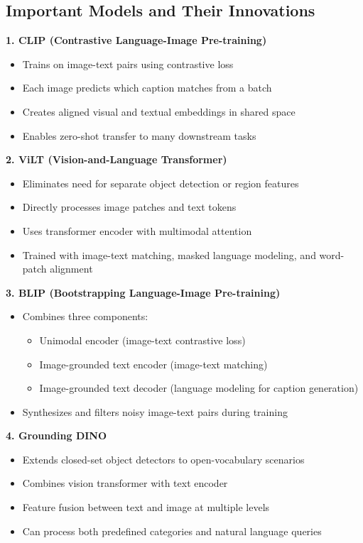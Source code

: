 \subsection*{Important Models and Their Innovations}

\textbf{1. CLIP (Contrastive Language-Image Pre-training)}
\begin{itemize}
    \item Trains on image-text pairs using contrastive loss
    \item Each image predicts which caption matches from a batch
    \item Creates aligned visual and textual embeddings in shared space
    \item Enables zero-shot transfer to many downstream tasks
\end{itemize}

\textbf{2. ViLT (Vision-and-Language Transformer)}
\begin{itemize}
    \item Eliminates need for separate object detection or region features
    \item Directly processes image patches and text tokens
    \item Uses transformer encoder with multimodal attention
    \item Trained with image-text matching, masked language modeling, and word-patch alignment
\end{itemize}

\textbf{3. BLIP (Bootstrapping Language-Image Pre-training)}
\begin{itemize}
    \item Combines three components:
    \begin{itemize}
        \item Unimodal encoder (image-text contrastive loss)
        \item Image-grounded text encoder (image-text matching)
        \item Image-grounded text decoder (language modeling for caption generation)
    \end{itemize}
    \item Synthesizes and filters noisy image-text pairs during training
\end{itemize}

\textbf{4. Grounding DINO}
\begin{itemize}
    \item Extends closed-set object detectors to open-vocabulary scenarios
    \item Combines vision transformer with text encoder
    \item Feature fusion between text and image at multiple levels
    \item Can process both predefined categories and natural language queries
\end{itemize}

